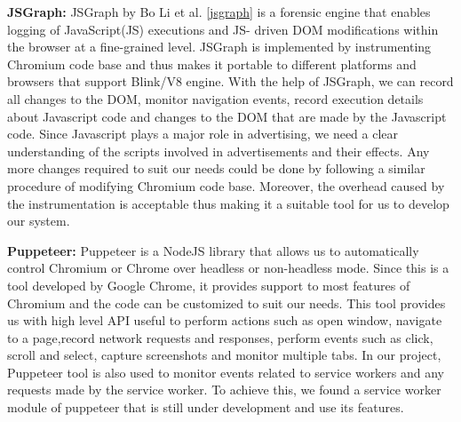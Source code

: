 \noindent \textbf{JSGraph:} JSGraph by Bo Li et al. \ref{jsgraph} is a forensic engine that enables logging of  JavaScript(JS) executions and JS- driven DOM modifications within the browser at a fine-grained level. JSGraph is implemented by instrumenting Chromium code base and thus makes it portable to different platforms and browsers that support Blink/V8 engine. With the help of JSGraph, we can record all changes to the DOM, monitor navigation events, record execution details about Javascript code and changes to the DOM that are made by the Javascript code. Since Javascript plays a major role in advertising, we need a clear understanding of the scripts involved in advertisements and their effects. Any more changes required to suit our needs could be done by following a similar procedure of modifying Chromium code base. Moreover, the overhead caused by the instrumentation is acceptable thus making it a suitable tool for us to develop our system.

\noindent \textbf{Puppeteer:} Puppeteer is a NodeJS library that allows us to automatically control Chromium or Chrome over headless or non-headless mode. Since this is a tool developed by Google Chrome, it provides support to most features of Chromium and the code can be customized to suit our needs. This tool provides us with high level API useful to perform actions such as open window, navigate to a page,record network requests and responses, perform events such as click, scroll and select, capture screenshots and monitor multiple tabs. In our project, Puppeteer tool is also used to monitor events related to service workers and any requests made by the service worker. To achieve this, we found a service worker module of puppeteer that is still under development and use its features.



